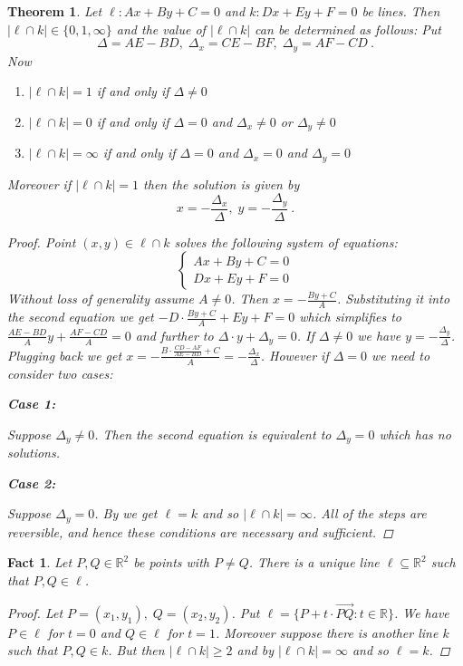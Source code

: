 \documentclass[a4paper,12pt]{report}
\newtheorem{fact}{Fact}
\newtheorem{theorem}{Theorem}
\begin{document}
\begin{theorem}\label{Intersection of Lines}
  Let $\ell:Ax+By+C=0$ and $k:Dx+Ey+F=0$ be lines. Then $|\ell\cap k|\in\{0,1,\infty\}$ and the value of $|\ell\cap k|$ can be determined as follows: Put 
  \[
    \Delta=AE-BD, \; \Delta_x=CE-BF, \; \Delta_y=AF-CD ~.
  \]
  Now
  \begin{enumerate}
    \item $|\ell \cap k|=1$ if and only if $\Delta\ne 0$
    \item $|\ell\cap k|=0$ if and only if $\Delta=0$ and $\Delta_x\ne 0$ or $\Delta_y\ne 0$
    \item $|\ell\cap k|=\infty$ if and only if $\Delta=0$ and $\Delta_x=0$ and $\Delta_y=0$
  \end{enumerate}
  Moreover if $|\ell \cap k|=1$ then the solution is given by
  \[
    x=-\frac{\Delta_x}{\Delta}, \; y=-\frac{\Delta_y}{\Delta} ~.
  \]
\begin{proof}
Point $(x,y)\in \ell \cap k$ solves the following system of equations:
\[
  \begin{cases}Ax + By + C = 0 \\Dx + Ey + F = 0\end{cases}
\]
Without loss of generality assume $A\ne 0$. Then $x=-\frac{By+C}{A}$. Substituting it into the second equation we get $-D\cdot \frac{By+C}{A}+Ey+F=0$ which simplifies to $\frac{AE-BD}{A}y+\frac{AF-CD}{A}=0$ and further to $\Delta\cdot y+\Delta_y=0$. If $\Delta\ne 0$ we have $y=-\frac{\Delta_y}{\Delta}$. Plugging back we get $x=-\frac{B\cdot \frac{CD-AF}{AE-BD}+C}{A}=-\frac{\Delta_x}{\Delta}$. However if $\Delta=0$ we need to consider two cases:

\textbf{Case 1:}

Suppose $\Delta_y\ne 0$. Then the second equation is equivalent to $\Delta_y=0$ which has no solutions.

\textbf{Case 2:}

Suppose $\Delta_y=0$. By  we get $\ell=k$ and so $|\ell\cap k|=\infty$. All of the steps are reversible, and hence these conditions are necessary and sufficient.  
\end{proof}
\end{theorem}

\begin{fact}\label{Two points, one line}
  Let $P,Q\in\mathbb{R}^2$ be points with $P\ne Q$. There is a unique line $\ell\subseteq\mathbb{R}^2$ such that $P,Q\in\ell$.
\begin{proof}
  Let $P=(x_1,y_1),\;Q=(x_2,y_2)$. Put $\ell=\{P+t\cdot \vec{PQ}:t\in \mathbb{R}\}$. We have $P\in\ell$ for $t=0$ and $Q\in\ell$ for $t=1$. Moreover suppose there is another line $k$ such that $P,Q\in k$. But then $|\ell\cap k|\ge 2$ and by  $|\ell \cap k|=\infty$ and so $\ell=k$.
\end{proof}
\end{fact}
\end{document}
